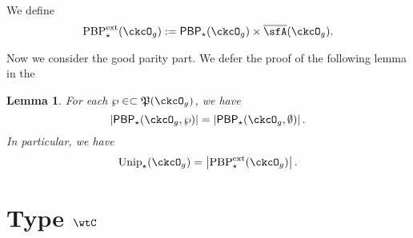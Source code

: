\documentclass[12pt,a4paper]{amsart}
\def\abs#1{\left|{#1}\right|}
\newcommand{\CQ}{{\mathcal {Q}}}
\newcommand{\sgn}{\operatorname{sgn}}
\numberwithin{equation}{section}
\newtheorem{lem}[thm]{Lemma}
\theoremstyle{remark}
\def\Unip{\mathrm{Unip}}
\def\Cint#1{\Coh_{[#1]}}
\def\Coh{\mathrm{Coh}}
\def\CQ{\overline{\sfA}}%
\def\CPP{\mathfrak{P}}
\def\PBPes{\mathrm{PBP}^{\mathrm{ext}}_{\star}}
\def\PBP{\mathsf{PBP}}
\begin{document}

We define
\[
 \PBPes(\ckcO_{g}) := \PBP_{\star}(\ckcO_{g})\times \CQ(\ckcO_{g}).
\]

Now we consider the good parity part. We defer the proof of the following lemma
in the 

\begin{lem}
  For each $\wp\in \subset \CPP(\ckcO_{g})$,
  we have
  \[
    \abs{\PBP_{\star}(\ckcO_{g},\wp)} =
    \abs{\PBP_{\star}(\ckcO_{g},\emptyset)}.
  \]
  In particular, we have
  \[
    \Unip_{\star}(\ckcO_{g}) = \abs{\PBPes(\ckcO_{g})}.
  \]
\end{lem}

\section{Type $\wtC$}
\end{document}
